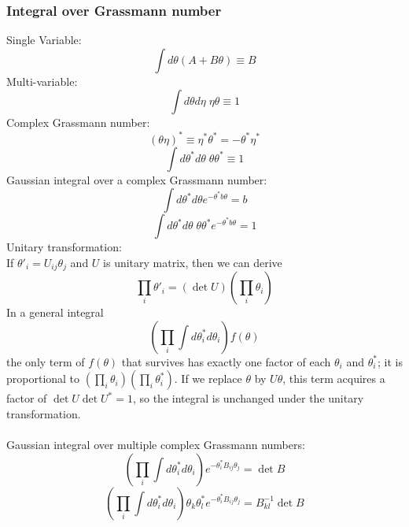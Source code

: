 \documentclass[cyan]{elegantnote}
\begin{document}
\subsubsection{Integral over Grassmann number}
\noindent
Single Variable:
\[\int d\theta (A + B\theta) \equiv B\]
Multi-variable:
\[\int d\theta d\eta \; \eta \theta \equiv 1\]
Complex Grassmann number:
\[(\theta \eta)^* \equiv \eta^* \theta^* = -\theta^* \eta^*\]
\[\int d\theta^* d\theta \; \theta \theta^* \equiv 1\]
Gaussian integral over a complex Grassmann number:
\[\int d\theta^* d\theta e^{-\theta^* b \theta} = b\]
\[\int d\theta^* d\theta \; \theta \theta^* e^{-\theta^* b \theta}  = 1\]
Unitary transformation:\\
If $\theta'_i = U_{ij}\theta_j$ and $U$ is unitary matrix, then we can derive
\[\prod_i \theta'_i = (\det U) (\prod_i \theta_i)\]
In a general integral
\[(\prod_i \int d\theta^*_i d\theta_i) f(\theta)\]
the only term of $f(\theta)$ that survives has exactly one factor of each $\theta_i$ and $\theta^*_i$; it is proportional to $(\prod_i \theta_i)(\prod_i \theta^*_i)$. If we replace $\theta$ by $U\theta$, this term acquires a factor of $\det U \det U^* = 1$, so the integral is unchanged under the unitary transformation.\\ \\
Gaussian integral over multiple complex Grassmann numbers:
\[(\prod_i \int d\theta^*_i d\theta_i) e^{-\theta^*_i B_{ij}\theta_j} = \det B\]
\[(\prod_i \int d\theta^*_i d\theta_i) \theta_k \theta^*_l e^{-\theta^*_i B_{ij}\theta_j} =B^{-1}_{kl} \det B\]
\end{document}
